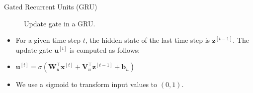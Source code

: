 \begin{vbframe}{Gated Recurrent Units (GRU)}
    \begin{figure}
      \centering
      \caption{\footnotesize{Update gate in a GRU.}}
  \end{figure}
  \begin{itemize}
    \item For a given time step $t$, the hidden state of the last time step is $\mathbf{z}^{[t-1]}$. The update gate $\mathbf{u}^{[t]}$ is computed as follows:
   \item $\mathbf{u}^{[t]} = \sigma(\mathbf{W}_{u}^\top \mathbf{x}^{[t]} + \mathbf{V}_{u}^\top \mathbf{z}^{[t-1]}  + \mathbf{b}_u)$
    \item We use a sigmoid to transform input values to $(0,1)$.
  \end{itemize}
\end{vbframe}

